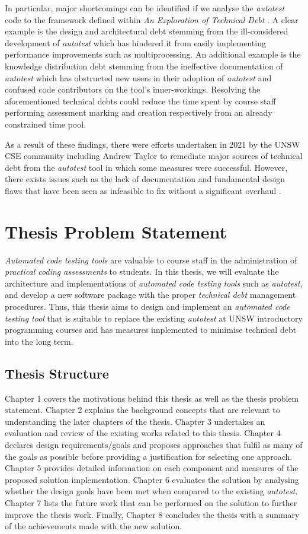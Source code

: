 \documentclass[hidelinks]{report}
\begin{document}
In particular, major shortcomings can be identified if we analyse the \textit{autotest} code to the framework defined within \textit{An Exploration of Technical Debt} \cite{TechnicalDebt}. A clear example is the design and architectural debt stemming from the ill-considered development of \textit{autotest} which has hindered it from easily implementing performance improvements such as multiprocessing. An additional example is the knowledge distribution debt stemming from the ineffective documentation of \textit{autotest} which has obstructed new users in their adoption of \textit{autotest} and confused code contributors on the tool's inner-workings. Resolving the aforementioned technical debts could reduce the time spent by course staff performing assessment marking and creation respectively from an already constrained time pool.

As a result of these findings, there were efforts undertaken in 2021 by the UNSW CSE community including Andrew Taylor to remediate major sources of technical debt from the \textit{autotest} tool in which some measures were successful. However, there exists issues such as the lack of documentation and fundamental design flaws that have been seen as infeasible to fix without a significant overhaul \cite{AutotestIssues}.

\section{Thesis Problem Statement}
\textit{Automated code testing tools} are valuable to course staff in the administration of \textit{practical coding assessments} to students. In this thesis, we will evaluate the architecture and implementations of \textit{automated code testing tools} such as \textit{autotest}, and develop a new software package with the proper \textit{technical debt} management procedures. Thus, this thesis aims to design and implement an \textit{automated code testing tool} that is suitable to replace the existing \textit{autotest} at UNSW introductory programming courses and has measures implemented to minimise technical debt into the long term.

\subsection{Thesis Structure}
Chapter 1 covers the motivations behind this thesis as well as the thesis problem statement.
Chapter 2 explains the background concepts that are relevant to understanding the later chapters of the thesis.
Chapter 3 undertakes an evaluation and review of the existing works related to this thesis.
Chapter 4 declares design requirements/goals and proposes approaches that fulfil as many of the goals as possible before providing a justification for selecting one approach.
Chapter 5 provides detailed information on each component and measures of the proposed solution implementation.
Chapter 6 evaluates the solution by analysing whether the design goals have been met when compared to the existing \textit{autotest}.
Chapter 7 lists the future work that can be performed on the solution to further improve the thesis work. 
Finally, Chapter 8 concludes the thesis with a summary of the achievements made with the new solution.
\end{document}
